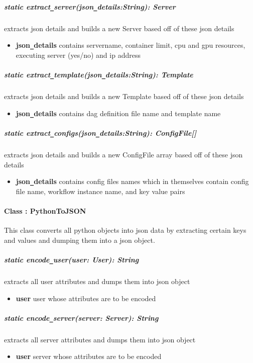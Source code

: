 \subparagraph{static extract\texttt{\_}server(json\texttt{\_}details:String): Server}
extracts json details and builds a new Server based off of these json details
\begin{itemize}
        \item \textbf{json\texttt{\_}details}
        contains servername, container limit, cpu and gpu resources, executing server (yes/no) and ip address
\end{itemize}

\subparagraph{static extract\texttt{\_}template(json\texttt{\_}details:String): Template}
extracts json details and builds a new Template based off of these json details
\begin{itemize}
        \item \textbf{json\texttt{\_}details}
        contains dag definition file name and template name
\end{itemize}

\subparagraph{static extract\texttt{\_}configs(json\texttt{\_}details:String): ConfigFile[]}
extracts json details and builds a new ConfigFile array based off of these json details
\begin{itemize}
        \item \textbf{json\texttt{\_}details}
        contains config files names which in themselves contain config file name, workflow instance name,
        and key value pairs
\end{itemize}

\paragraph{Class : PythonToJSON}
This class converts all python objects into json data by extracting certain keys and values and dumping
them into a json object.

\subparagraph{static encode\texttt{\_}user(user: User): String}
extracts all user attributes and dumps them into json object
\begin{itemize}
        \item \textbf{user}
        user whose attributes are to be encoded
\end{itemize}

\subparagraph{static encode\texttt{\_}server(server: Server): String}
extracts all server attributes and dumps them into json object
\begin{itemize}
        \item \textbf{user}
        server whose attributes are to be encoded
\end{itemize}

